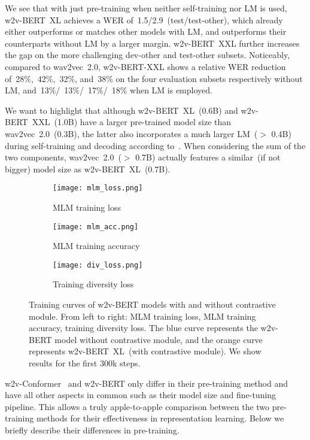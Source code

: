 \documentclass{article}
\begin{document}
We see that with just pre-training when neither self-training nor LM is used, w2v-BERT~XL achieves a WER of~1.5/2.9~(test/test-other), which already either outperforms or matches other models with LM, and outperforms their counterparts without LM by a larger margin.
w2v-BERT~XXL further increases the gap on the more challenging dev-other and test-other subsets.
Noticeably, compared to wav2vec~2.0, w2v-BERT-XXL shows a relative WER reduction of~28\%,~42\%,~32\%, and~38\% on the four evaluation subsets respectively without LM, and~13\%/~13\%/~17\%/~18\% when LM is employed.

We want to highlight that although w2v-BERT~XL~(0.6B) and w2v-BERT~XXL~(1.0B) have a larger pre-trained model size than wav2vec~2.0~(0.3B), the latter also incorporates a much larger LM~($>$ 0.4B) during self-training and decoding according to~\cite{xu2021self,baevski2020wav2vec}.
When considering the sum of the two components, wav2vec~2.0~($>$ 0.7B) actually features a similar~(if not bigger) model size as w2v-BERT~XL~(0.7B).


\begin{figure*}[htbp]
  \centering
  \begin{subfigure}[b]{0.325\textwidth}
    \centering
    \texttt{[image: mlm\_loss.png]}
    \caption{MLM training loss}
    \label{fig:mlm_loss}
  \end{subfigure}
  \hfill
  \begin{subfigure}[b]{0.33\textwidth}
    \centering
    \texttt{[image: mlm\_acc.png]}
    \caption{MLM training accuracy}
    \label{fig:mlm_acc}
  \end{subfigure}
  \hfill
  \begin{subfigure}[b]{0.33\textwidth}
    \centering
    \texttt{[image: div\_loss.png]}
    \caption{Training diversity loss}
    \label{fig:div_loss}
  \end{subfigure}
  \caption{Training curves of w2v-BERT models with and without contrastive module. From left to right: MLM training loss, MLM training accuracy, training diversity loss. The blue curve represents the w2v-BERT model without contrastive module, and the orange curve represents w2v-BERT~XL~(with contrastive module). We show results for the first 300k steps.}
  \label{fig:learning_curves}
\end{figure*}


w2v-Conformer~\cite{zhang2020pushing} and w2v-BERT only differ in their pre-training method and have all other aspects in common such as their model size and fine-tuning pipeline.
This allows a truly apple-to-apple comparison between the two pre-training methods for their effectiveness in representation learning.
Below we briefly describe their differences in pre-training.
\end{document}
